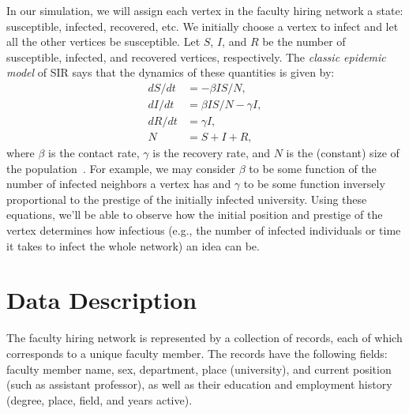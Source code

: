\documentclass{article}
\begin{document}
In our simulation, we will assign each vertex in the faculty hiring network a
state: susceptible, infected, recovered, etc. We initially choose a vertex to
infect and let all the other vertices be susceptible. Let $S$, $I$, and $R$ be
the number of susceptible, infected, and recovered vertices, respectively. The \emph{classic epidemic model} of SIR says that the dynamics of these quantities is given by:
    \begin{align*}
        dS/dt &= -\beta IS/N,\\
        dI/dt &= \beta IS/N - \gamma I,\\
        dR/dt &= \gamma I,\\
        N &= S + I + R,
    \end{align*}
where $\beta$ is the contact rate, $\gamma$ is the recovery rate, and $N$ is the
(constant) size of the population~\cite{newman:networks,hethcote}. For example,
we may consider $\beta$ to be some function of the number of infected neighbors
a vertex has and $\gamma$ to be some function inversely proportional to the
prestige of the initially infected university. Using these equations, we'll be
able to observe how the initial position and prestige of the vertex determines how infectious (e.g., the number of infected individuals or time it takes to infect the whole network) an idea can be.


\section{Data Description}\label{proposal}
The faculty hiring network is represented by a collection of records, each of
which corresponds to a unique faculty member. The records have the following
fields: faculty member name, sex, department, place (university), and current position (such as assistant
professor), as well as their education and employment history (degree, place,
field, and years active).




\end{document}
